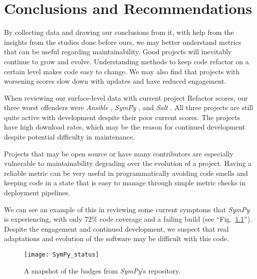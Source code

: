 \chapter{Conclusions and Recommendations} \label{chapterConclusion}


By collecting data and drawing our conclusions from it, with help from the insights from the studies done before ours, we may better understand metrics that can be useful regarding maintainability. Good projects will inevitably continue to grow and evolve. Understanding methods to keep code refactor on a certain level makes code easy to change. We may also find that projects with worsening scores slow down with updates and have reduced engagement.

When reviewing our surface-level data with current project Refactor scores, our three worst offenders were \emph{Ansible} \cite{data:ansible}, \emph{SymPy} \cite{data:sympy}, and \emph{Salt} \cite{data:salt}. All three projects are still quite active with development despite their poor current scores. The projects have high download rates, which may be the reason for continued development despite potential difficulty in maintenance.

Projects that may be open source or have many contributors are especially vulnerable to maintainability degrading over the evolution of a project. Having a reliable metric can be very useful in programmatically avoiding code smells and keeping code in a state that is easy to manage through simple metric checks in deployment pipelines.

We can see an example of this in reviewing some current symptoms that \emph{SymPy} is experiencing, with only 72\% code coverage and a failing build (see ``Fig.~\ref{figSymPyStatus}''). Despite the engagement and continued development, we suspect that real adaptations and evolution of the software may be difficult with this code.

\begin{figure}[ht]
  \centerline{
    \texttt{[image: SymPy\_status]}
  }
  \caption{A snapshot of the badges from \emph{SymPy}'s repository.}
    \label{figSymPyStatus}
\end{figure}



